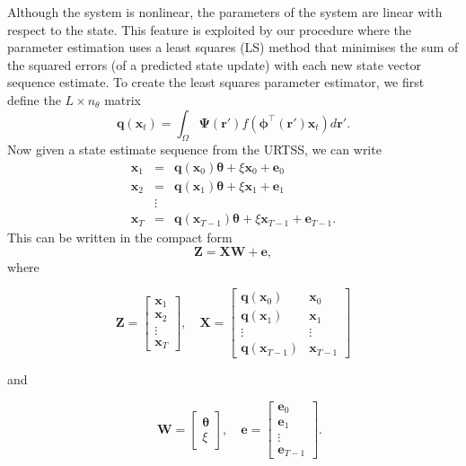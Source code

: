 \documentclass[10pt,a4paper]{article}
\begin{document}
Although the system is nonlinear, the parameters of the system are linear with respect to the state. This feature is exploited by our procedure where the parameter estimation uses a least squares (LS) method that minimises the sum of the squared errors (of a predicted state update) with each new state vector sequence estimate. To create the least squares parameter estimator, we first define the $L \times n_{\theta}$ matrix
\begin{equation}
	\mathbf{q}(\mathbf{x}_t) = \int_\Omega \boldsymbol{\Psi}(\mathbf{r}') f(\boldsymbol{\phi}^{\top}(\mathbf{r}')\mathbf{x}_t) d\mathbf{r}'.
\end{equation}
Now given a state estimate sequence from the URTSS, we can write
\begin{eqnarray*}
	\mathbf x_{1} &=& \mathbf{q}(\mathbf x_0) \boldsymbol{\theta}+\xi\mathbf x_0+\mathbf e_0 \\
	\mathbf x_{2} &=& \mathbf{q}(\mathbf x_1) \boldsymbol{\theta}+\xi\mathbf x_1+\mathbf e_1  \\
	&\vdots& \\
	\mathbf x_{T}&=&\mathbf{q}(\mathbf x_{T-1}) \boldsymbol{\theta}+\xi\mathbf x_{T-1}+\mathbf e_{T-1}. 
\end{eqnarray*}
This can be written in the compact form
\begin{equation}
	\mathbf Z=\mathbf X \mathbf W+\mathbf{e}, 
\end{equation}
where
\begin{small}
\begin{equation*}
	\mathbf Z=\left[
	\begin{array}{cccc}
		\mathbf x_{1}\\
		\mathbf x_{2}\\
		\vdots\\
		\mathbf x_{T}
	\end{array}
	\right],\quad \mathbf X=\left[
	\begin{array}{cccc}
		\mathbf q(\mathbf x_0)& \mathbf x_{0}\\
		\mathbf q(\mathbf x_1)& \mathbf x_{1}\\
		\vdots & \vdots\\
		\mathbf q(\mathbf x_{T-1})& \mathbf x_{T-1}
	\end{array}
	\right] 
\end{equation*}
\end{small}
and
\begin{small}
\begin{equation*}
\quad \mathbf W=\left[
	\begin{array}{cc}
		\boldsymbol{\theta} \\
		\xi
	\end{array}
	\right],\quad \mathbf{e}=\left[
	\begin{array}{cccc}
		\mathbf e_0\\
		\mathbf e_1\\
		\vdots\\
		\mathbf e_{T-1}
	\end{array}
	\right].
\end{equation*}
\end{small}
\end{document}
